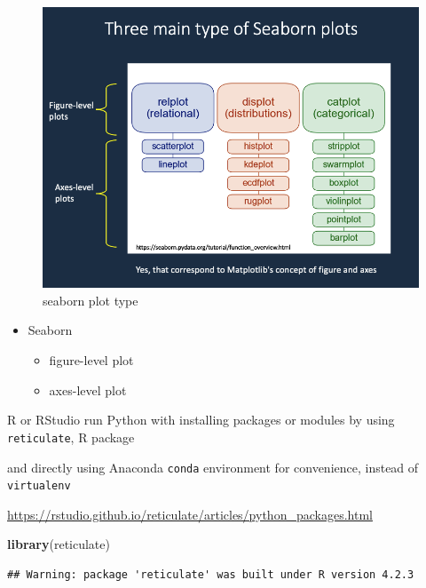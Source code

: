 \documentclass[
]{book}
\newenvironment{Shaded}{\begin{snugshade}}{\end{snugshade}}
\newcommand{\FunctionTok}[1]{\textcolor[rgb]{0.13,0.29,0.53}{\textbf{#1}}}
\newcommand{\NormalTok}[1]{#1}
\providecommand{\tightlist}{%
  \setlength{\itemsep}{0pt}\setlength{\parskip}{0pt}}
\theoremstyle{definition}
\theoremstyle{definition}
\theoremstyle{definition}
\theoremstyle{definition}
\theoremstyle{remark}
\begin{document}
\begin{figure}
\includegraphics[width=1\linewidth]{img/seaborn-plot-type} \caption{seaborn plot type}\label{fig:seaborn-plot-type}
\end{figure}

\begin{itemize}
\tightlist
\item
  Seaborn

  \begin{itemize}
  \tightlist
  \item
    figure-level plot
  \item
    axes-level plot
  \end{itemize}
\end{itemize}

R or RStudio run Python with installing packages or modules by using \texttt{reticulate}, R package

and directly using Anaconda \texttt{conda} environment for convenience, instead of \texttt{virtualenv}

\url{https://rstudio.github.io/reticulate/articles/python_packages.html}

\begin{Shaded}
\begin{Highlighting}[]
\FunctionTok{library}\NormalTok{(reticulate)}
\end{Highlighting}
\end{Shaded}

\begin{verbatim}
## Warning: package 'reticulate' was built under R version 4.2.3
\end{verbatim}
\end{document}
